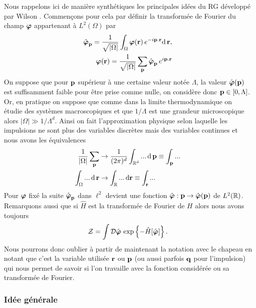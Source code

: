 \documentclass[10pt]{article}
\begin{document}
\begin{multicols}{2}
Nous rappelons ici de manière synthétiques les principales idées du RG développé par Wilson \cite{wilson}. Commençons pour cela par définir la transformée de Fourier du champ $\boldsymbol{ \varphi}$ appartenant à $L^2(\Omega)$ par 
\begin{equation}
\begin{split}
\hat{\boldsymbol{ \varphi}}_{\bf p} = \frac{1}{\sqrt{|\Omega|}}\int_\Omega \boldsymbol{ \varphi}({\bf r}) \, e^{-i {\bf p} . {\bf r}} \text{d} \, {\bf r}, \\
\boldsymbol{ \varphi}({\bf r}) = \frac{1}{\sqrt{|\Omega|}}\sum_{\bf p} \hat{\boldsymbol{ \varphi}}_{\bf p} \, e^{i {\bf p}  .{\bf r}}
\end{split} 	
\end{equation}
On suppose que pour ${\bf p}$ supérieur à une certaine valeur notée $\Lambda$, la valeur $\hat{\boldsymbol{ \varphi}}({\bf p})$ est suffisamment faible pour être prise comme nulle, on considère donc ${\bf p} \in [0, \Lambda]$. Or, en pratique on suppose que comme dans la limite thermodynamique on étudie des systèmes macroscopiques et que $1/\Lambda$ est une grandeur microscopique alors $|\Omega|\gg 1/\Lambda^d$. Ainsi on fait l'approximation physique selon laquelle les impulsions ne sont plus des variables discrètes mais des variables continues et nous avons les équivalences  
\begin{equation}
\begin{split}
	\frac{1}{|\Omega|} \sum_{{\bf p}} & \rightarrow \frac{1}{(2\pi)^d} \int_{\mathbb{R}^d} ... \, \text{d} \, {\bf p}  \equiv \int_{\bf p} ... \\
	\int_\Omega	... \, \text{d} \, {\bf r} & \rightarrow \int_{\mathbb{R}} ... \, \text{d} {\bf r} \equiv \int_{\bf r} ...
\end{split}
\end{equation}
Pour $\boldsymbol{ \varphi}$ fixé la suite $\hat{\boldsymbol{ \varphi}}_{\bf p}$ dans $\ell^2$ devient une fonction $\hat{\boldsymbol{ \varphi}} : {\bf p} \rightarrow \hat{\boldsymbol{ \varphi}}({\bf p})$ de $L^2(\mathbb{R})$. 
Remarquons aussi que si $\hat{H}$ est la transformée de Fourier de $H$ alors nous avons toujours
\begin{equation}
\mathcal{Z} = \int \mathcal{D} \hat{\boldsymbol{ \varphi}} \, \exp\left\{- \hat{H}[\hat{\boldsymbol{ \varphi}}]\right\}. 
\end{equation} 
Nous pourrons donc oublier à partir de maintenant la notation avec le chapeau en notant que c'est la variable utilisée ${\bf r}$ ou ${\bf p}$ (ou aussi parfois ${\bf q}$ pour l'impulsion) qui nous permet de savoir si l'on travaille avec la fonction considérée ou sa transformée de Fourier. \\


\subsubsection{Idée générale}


\end{multicols}
\end{document}
